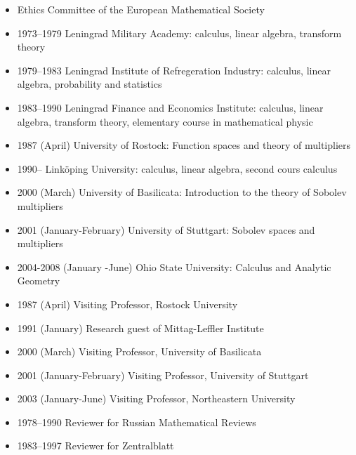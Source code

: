 \documentclass{article}
\begin{document}
  \begin{itemize}
     \item Ethics Committee  of the European Mathematical Society
   \end{itemize}

\begin{itemize}
         \item 1973--1979 Leningrad Military Academy: calculus, linear
algebra, transform theory
         \item 1979--1983 Leningrad Institute of Refregeration
Industry: calculus, linear algebra, probability and statistics
         \item 1983--1990 Leningrad Finance and Economics Institute:
calculus, linear algebra, transform theory, elementary course
         in mathematical physic
         \item 1987 (April) University of Rostock: Function spaces and
theory of multipliers
         \item 1990-- Link\"oping University: calculus, linear
algebra, second cours calculus
         \item 2000 (March) University of Basilicata: Introduction to
the theory of Sobolev multipliers
         \item 2001 (January-February) University of Stuttgart:
Sobolev spaces and multipliers
        \item 2004-2008 (January -June) Ohio State University: Calculus and Analytic Geometry
\end{itemize}


\begin{itemize}
         \item 1987 (April) Visiting Professor, Rostock University
         \item 1991 (January) Research guest of Mittag-Leffler Institute
         \item 2000 (March) Visiting Professor, University of Basilicata
         \item 2001 (January-February) Visiting Professor, University
of Stuttgart
         \item 2003 (January-June) Visiting Professor,
Northeastern University
\item 1978--1990 Reviewer for Russian Mathematical Reviews
         \item 1983--1997 Reviewer for Zentralblatt
\end{itemize}
\end{document}
